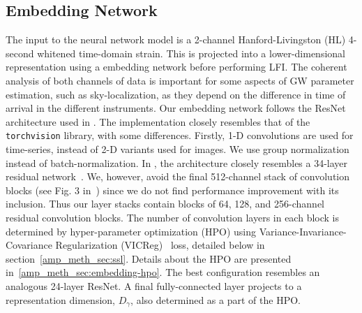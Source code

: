 \begin{refsection}
\section{Embedding Network}
\label{amp_meth_sec:embedding-net}
The input to the neural network model is a 2-channel Hanford-Livingston (HL) 4-second whitened time-domain strain. 
This is projected into a lower-dimensional representation using a embedding network before performing LFI.
The coherent analysis of both channels of data is important for some aspects of GW parameter estimation, such as sky-localization, as they depend on the difference in time of arrival in the different instruments. 
Our embedding network follows the ResNet architecture used in \aframe.
The implementation closely resembles that of the \texttt{torchvision} library, with some differences.
Firstly, {1-D} convolutions are used for time-series, instead of {2-D} variants used for images. 
We use group normalization~\cite{wu2018groupnormalization} instead of batch-normalization.
In \aframe, the architecture closely resembles a 34-layer residual network~\cite{he2015deepresiduallearningimage}.
We, however, avoid the final 512-channel stack of convolution blocks (see Fig. 3 in~\cite{he2015deepresiduallearningimage}) since we do not find performance improvement with its inclusion. 
Thus our layer stacks contain blocks of 64, 128, and 256-channel residual convolution blocks. 
The number of convolution layers in each block is determined by hyper-parameter optimization (HPO) using Variance-Invariance-Covariance Regularization (VICReg)~\cite{bardes2022vicreg} loss, detailed below in section~\ref{amp_meth_sec:ssl}.
Details about the HPO are presented in~\ref{amp_meth_sec:embedding-hpo}. 
The best configuration resembles an analogous 24-layer ResNet. 
A final fully-connected layer projects to a representation dimension, $D_{\gamma}$, also determined as a part of the HPO.


\end{refsection}
